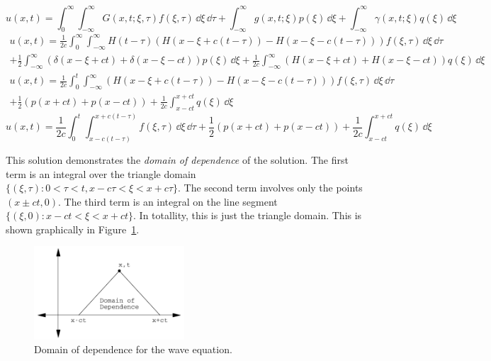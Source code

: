 {%
\begin{Solution}
  \[
  u(x,t) = \int_0^\infty \int_{-\infty}^\infty G(x,t;\xi,\tau) f(\xi,\tau) \,\dd \xi \,\dd \tau 
  + \int_{-\infty}^\infty g(x,t;\xi) p(\xi) \,\dd \xi 
  + \int_{-\infty}^\infty \gamma(x,t;\xi) q(\xi) \,\dd \xi
  \]
  \begin{multline*}
    u(x, t) = \frac{1}{2 c} \int_0^\infty \int_{-\infty}^\infty H(t - \tau) (H(x - \xi + c(t - \tau))
    - H(x - \xi - c(t - \tau)) ) f(\xi, \tau) \,\dd \xi \,\dd \tau 
    \\
    + \frac{1}{2} \int_{-\infty}^\infty ( \delta(x - \xi + c t) 
    + \delta(x - \xi - c t) ) p(\xi) \,\dd \xi
    + \frac{1}{2 c} \int_{-\infty}^\infty ( H(x - \xi + c t) 
    + H(x - \xi - c t) ) q(\xi) \,\dd \xi 
  \end{multline*}
  \begin{multline*}
    u(x, t) = \frac{1}{2 c} \int_0^t \int_{-\infty}^\infty (H(x - \xi + c(t - \tau))
    - H(x - \xi - c(t - \tau)) ) f(\xi, \tau) \,\dd \xi \,\dd \tau 
    \\
    + \frac{1}{2} (p(x + c t) + p(x - c t))
    + \frac{1}{2 c} \int_{x - c t}^{x + c t} q(\xi) \,\dd \xi 
  \end{multline*}
  \[
  \boxed{
    u(x, t) = \frac{1}{2 c} \int_0^t \int_{x - c(t - \tau)}^{x + c(t - \tau)} 
    f(\xi, \tau) \,\dd \xi \,\dd \tau 
    + \frac{1}{2} (p(x + c t) + p(x - c t))
    + \frac{1}{2 c} \int_{x - c t}^{x + c t} q(\xi) \,\dd \xi 
    }
  \]

  This solution demonstrates the \textit{domain of dependence} of the
  solution.  The first term is an integral over the triangle domain
  $\{ (\xi,\tau) : 0 < \tau < t, x - c \tau < \xi < x + c \tau \}$.
  The second term involves only the points $(x \pm c t, 0)$.
  The third term is an integral on the line segment
  $\{ (\xi,0) : x - c t < \xi < x + c t \}$.
  In totallity, this is just the triangle domain.
  This is shown graphically in Figure~\ref{domain_of_dependence}.
  \begin{figure}[h!]
    \begin{center}
      \includegraphics[width=0.5\textwidth]{pde/green/domain_of_dependence}
    \end{center}
    \caption{Domain of dependence for the wave equation.}
    \label{domain_of_dependence}
  \end{figure}
\end{Solution}




}
